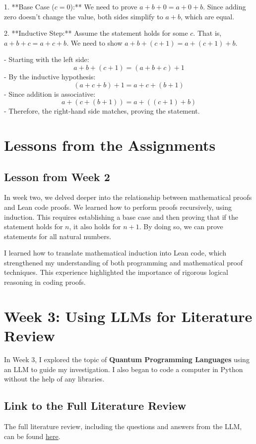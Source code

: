 \documentclass{article}
\begin{document}
1. **Base Case (\(c = 0\)):** We need to prove \(a + b + 0 = a + 0 + b\). Since adding zero doesn't change the value, both sides simplify to \(a + b\), which are equal.

2. **Inductive Step:** Assume the statement holds for some \(c\). That is, \(a + b + c = a + c + b\). We need to show \(a + b + (c + 1) = a + (c + 1) + b\).

   - Starting with the left side:
     \[
     a + b + (c + 1) = (a + b + c) + 1
     \]
   - By the inductive hypothesis:
     \[
     (a + c + b) + 1 = a + c + (b + 1)
     \]
   - Since addition is associative:
     \[
     a + (c + (b + 1)) = a + ((c + 1) + b)
     \]
   - Therefore, the right-hand side matches, proving the statement.

\section*{Lessons from the Assignments}
\subsection*{Lesson from Week 2}
In week two, we delved deeper into the relationship between mathematical proofs and Lean code proofs. We learned how to perform proofs recursively, using induction. This requires establishing a base case and then proving that if the statement holds for \(n\), it also holds for \(n + 1\). By doing so, we can prove statements for all natural numbers.

I learned how to translate mathematical induction into Lean code, which strengthened my understanding of both programming and mathematical proof techniques. This experience highlighted the importance of rigorous logical reasoning in coding proofs.

\section{Week 3: Using LLMs for Literature Review}
\label{sec:week3}

In Week 3, I explored the topic of \textbf{Quantum Programming Languages} using an LLM to guide my investigation. I also began to code a computer in Python without the help of any libraries.

\subsection*{Link to the Full Literature Review}
The full literature review, including the questions and answers from the LLM, can be found \href{https://github.com/cgillette/CPSC-354/blob/main/week3/README.md}{here}.
\end{document}
